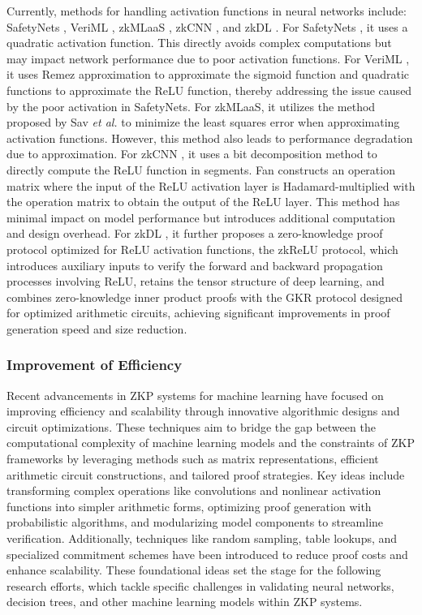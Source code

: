 \documentclass[journal]{IEEEtran}
\begin{document}
Currently, methods for handling activation functions in neural networks include: SafetyNets \cite{ghodsi2017safetynets}, VeriML \cite{zhao2021veriml}, zkMLaaS \cite{huang2022zkmlaas}, zkCNN \cite{liu2021zkcnn}, and zkDL \cite{sun2023zkdl}. For SafetyNets \cite{ghodsi2017safetynets}, it uses a quadratic activation function. This directly avoids complex computations but may impact network performance due to poor activation functions. For VeriML \cite{zhao2021veriml}, it uses Remez approximation to approximate the sigmoid function and quadratic functions to approximate the ReLU function, thereby addressing the issue caused by the poor activation in SafetyNets. For zkMLaaS, it utilizes the method proposed by Sav \emph{et al.} \cite{chen2020rosetta} to minimize the least squares error when approximating activation functions. However, this method also leads to performance degradation due to approximation. For zkCNN \cite{liu2021zkcnn}, it uses a bit decomposition method to directly compute the ReLU function in segments. Fan constructs an operation matrix where the input of the ReLU activation layer is Hadamard-multiplied with the operation matrix to obtain the output of the ReLU layer. This method has minimal impact on model performance but introduces additional computation and design overhead. For zkDL \cite{sun2023zkdl}, it further proposes a zero-knowledge proof protocol optimized for ReLU activation functions, the zkReLU protocol, which introduces auxiliary inputs to verify the forward and backward propagation processes involving ReLU, retains the tensor structure of deep learning, and combines zero-knowledge inner product proofs with the GKR protocol designed for optimized arithmetic circuits, achieving significant improvements in proof generation speed and size reduction.

\subsubsection{Improvement of Efficiency}\label{sss:3b}
Recent advancements in ZKP systems for machine learning have focused on improving efficiency and scalability through innovative algorithmic designs and circuit optimizations. These techniques aim to bridge the gap between the computational complexity of machine learning models and the constraints of ZKP frameworks by leveraging methods such as matrix representations, efficient arithmetic circuit constructions, and tailored proof strategies. Key ideas include transforming complex operations like convolutions and nonlinear activation functions into simpler arithmetic forms, optimizing proof generation with probabilistic algorithms, and modularizing model components to streamline verification. Additionally, techniques like random sampling, table lookups, and specialized commitment schemes have been introduced to reduce proof costs and enhance scalability. These foundational ideas set the stage for the following research efforts, which tackle specific challenges in validating neural networks, decision trees, and other machine learning models within ZKP systems.
\end{document}
